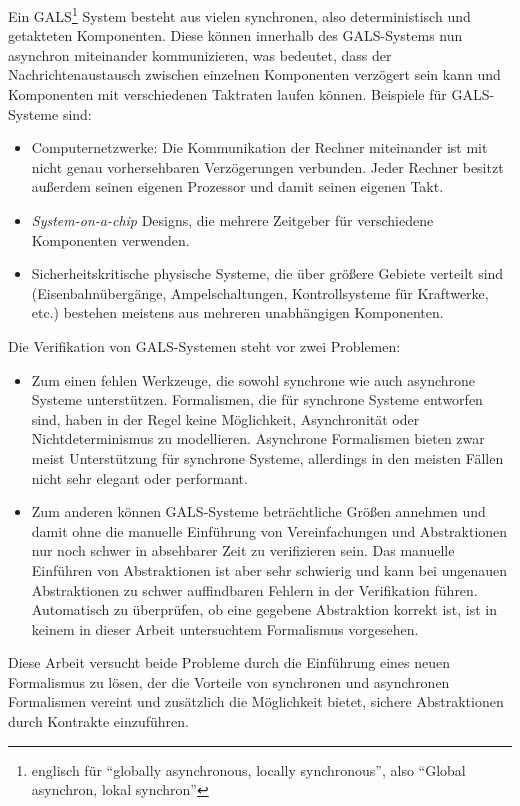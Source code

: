 Ein GALS\footnote{englisch für "`globally asynchronous, locally synchronous"', also "`Global asynchron, lokal synchron"'} System besteht aus vielen synchronen, also deterministisch und getakteten Komponenten.
Diese können innerhalb des GALS-Systems nun asynchron miteinander kommunizieren, was bedeutet, dass der Nachrichtenaustausch zwischen einzelnen Komponenten verzögert sein kann und Komponenten mit verschiedenen Taktraten laufen können.
Beispiele für GALS-Systeme sind:
\begin{itemize}
\item Computernetzwerke: Die Kommunikation der Rechner miteinander ist mit nicht genau vorhersehbaren Verzögerungen verbunden.
  Jeder Rechner besitzt außerdem seinen eigenen Prozessor und damit seinen eigenen Takt.
\item \emph{System-on-a-chip} Designs, die mehrere Zeitgeber für verschiedene Komponenten verwenden.
\item Sicherheitskritische physische Systeme, die über größere Gebiete verteilt sind (Eisenbahnübergänge, Ampelschaltungen, Kontrollsysteme für Kraftwerke, etc.) bestehen meistens aus mehreren unabhängigen Komponenten.
\end{itemize}

Die Verifikation von GALS-Systemen steht vor zwei Problemen:
\begin{itemize}
\item Zum einen fehlen Werkzeuge, die sowohl synchrone wie auch asynchrone Systeme unterstützen.
  Formalismen, die für synchrone Systeme entworfen sind, haben in der Regel keine Möglichkeit, Asynchronität oder Nichtdeterminismus zu modellieren.
  Asynchrone Formalismen bieten zwar meist Unterstützung für synchrone Systeme, allerdings in den meisten Fällen nicht sehr elegant oder performant.
\item Zum anderen können GALS-Systeme beträchtliche Größen annehmen und damit ohne die manuelle Einführung von Vereinfachungen und Abstraktionen nur noch schwer in absehbarer Zeit zu verifizieren sein.
  Das manuelle Einführen von Abstraktionen ist aber sehr schwierig und kann bei ungenauen Abstraktionen zu schwer auffindbaren Fehlern in der Verifikation führen.
  Automatisch zu überprüfen, ob eine gegebene Abstraktion korrekt ist, ist in keinem in dieser Arbeit untersuchtem Formalismus vorgesehen.
\end{itemize}
Diese Arbeit versucht beide Probleme durch die Einführung eines neuen Formalismus zu lösen, der die Vorteile von synchronen und asynchronen Formalismen vereint und zusätzlich die Möglichkeit bietet, sichere Abstraktionen durch Kontrakte einzuführen.

